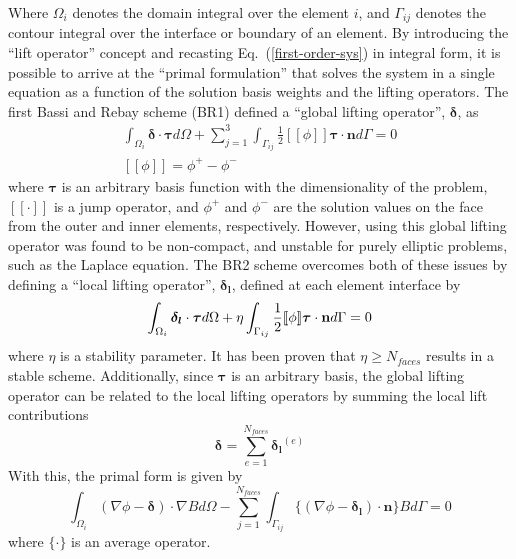 \documentclass[a4paper]{article}
\newcommand{\eref}[1]{Eq.~(\ref{#1})}
\newcommand{\dint}[1]{\int_{\Omega_i}{#1 d\Omega}}
\newcommand{\sint}[1]{\int_{\Gamma_{ij}}{#1 d\Gamma}}
\newcommand{\average}[1]{\ensuremath{\{#1\}} }
\newcommand{\jump}[1]{\ensuremath{[\![#1]\!]} }
\newcommand{\vbasis}{\boldsymbol{\tau}}
\newcommand{\glift}{\boldsymbol{\delta}}
\newcommand{\llift}{\boldsymbol{\delta_l}}
\newcommand{\unitn}{\mathbf{n}}
\begin{document}
Where $\Omega_i$ denotes the domain integral over the element $i$, and
$\Gamma_{ij}$ denotes the contour integral over the interface or boundary of an
element.
By introducing the ``lift operator'' concept and recasting
\eref{first-order-sys} in integral form, it is possible to arrive at the
``primal formulation'' that solves the system in a single equation as a function
of the solution basis weights and the lifting operators.  The first Bassi and
Rebay scheme\cite{BR1} (BR1) defined a ``global lifting operator'', $\glift$, as
\begin{gather}
  \dint{\glift \cdot \vbasis} + \sum_{j=1}^3\sint{\frac{1}{2} \jump{\phi}
  \vbasis \cdot \unitn} = 0 \label{global-lift-def}\\
  \jump{\phi} = \phi^+ - \phi^- \label{jump-def}
\end{gather}
where $\vbasis$ is an arbitrary basis function with the dimensionality of the
problem, $\jump{\cdot}$ is a jump operator, and $\phi^+$ and $\phi^-$ are the
solution values on the face from the outer and inner elements, respectively.
However, using this global lifting operator was found to be non-compact, and
unstable for purely elliptic problems, such as the Laplace equation. The BR2
scheme overcomes both of these issues by defining a ``local lifting operator'',
$\llift$, defined at each element interface by
\begin{equation}
  \dint{\llift \cdot \vbasis} + \eta\sint{\frac{1}{2} \jump{\phi} \vbasis
  \cdot \unitn} = 0 \\
  \label{local-lift-def}
\end{equation}
where $\eta$ is a stability parameter.  It has been proven\cite{hartmann} that
$\eta \geq N_{faces}$ results in a stable scheme.  Additionally, since
$\vbasis$ is an arbitrary basis, the global lifting operator can be related to
the local lifting operators by summing the local lift contributions
\begin{equation}
  \glift = \sum_{e=1}^{N_{faces}}{\llift^{(e)}}
  \label{local-global-relation}
\end{equation}
With this, the primal form is given by
\begin{equation}
  \dint{(\nabla \phi - \glift)\cdot \nabla B} -
  \sum_{j=1}^{N_{faces}}\sint{\average{(\nabla \phi - \llift)\cdot\unitn}B} = 0
  \label{primal-form}
\end{equation}
where $\average{\cdot}$ is an average operator.
\end{document}
